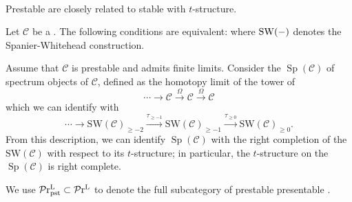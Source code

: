 \documentclass[a4paper,10pt, oneside]{amsart}
\begin{document}
	\begin{exam}\,
	\end{exam}
	
	Prestable \infcats are closely related to stable \infcats with $t$-structure.
	
	\begin{prop}
		Let $\mathcal{C}$ be a \infcat. The following conditions are equivalent:
		where $\mathrm{SW}(-)$ denotes the Spanier-Whitehead construction.
	\end{prop}
	\begin{rem}
		Assume that $\mathcal{C}$ is prestable and admits finite limits. Consider the \infcat $\operatorname{Sp}(\mathcal{C})$ of spectrum objects of $\mathcal{C}$, defined as the homotopy limit of the tower of \infcats
		$$
		\cdots \rightarrow \mathcal{C} \xrightarrow{\Omega} \mathcal{C} \xrightarrow{\Omega} \mathcal{C}
		$$
		which we can identify with
		$$
		\cdots \rightarrow \mathrm{SW}(\mathcal{C})_{\geq-2} \xrightarrow{\tau_{\geq-1}} \mathrm{SW}(\mathcal{C})_{\geq-1} \xrightarrow{\tau_{\geq 0}} \mathrm{SW}(\mathcal{C})_{\geq 0} .
		$$
		From this description, we can identify $\operatorname{Sp}(\mathcal{C})$ with the right completion of the \infcat $\mathrm{SW}(\mathcal{C})$ with respect to its $t$-structure; in particular, the $t$-structure on the \infcat $\operatorname{Sp}(\mathcal{C})$ is right complete.
	\end{rem}
	\begin{notation}
		We use $\mathcal{P}\mathrm{r}^\mathrm{L}_{\mathrm{pst}}\subset \mathcal{P}\mathrm{r}^\mathrm{L}$ to denote the full subcategory of prestable presentable \infcats.
	\end{notation}
\end{document}
